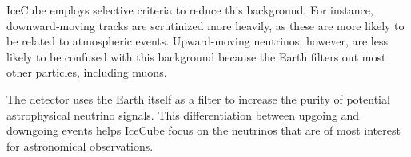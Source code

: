 IceCube employs selective criteria to reduce this background.
For instance, downward-moving tracks are scrutinized more heavily, as these are more likely to be related to atmospheric events.
Upward-moving neutrinos, however, are less likely to be confused with this background because the Earth filters out most other particles, including muons.

The detector uses the Earth itself as a filter to increase the purity of potential astrophysical neutrino signals.
This differentiation between upgoing and downgoing events helps IceCube focus on the neutrinos that are of most interest for astronomical observations.